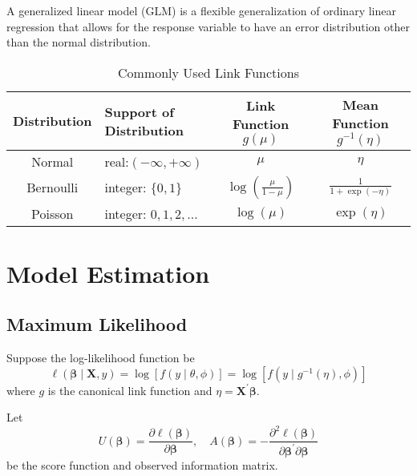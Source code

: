 \begin{remark}
    A generalized linear model (GLM) is a flexible generalization of ordinary linear regression that allows for the response variable to have an error distribution other than the normal distribution.
\end{remark}

\begin{table}[hpt]
    \centering
    \caption{Commonly Used Link Functions}
    \begin{tabular}{clcc}
        \toprule
        Distribution & Support of Distribution  & Link Function $g(\mu)$               & Mean Function $g^{-1}(\eta)$ \\
        \midrule
        Normal       & real:$(-\infty,+\infty)$ & $\mu$                                & $\eta$                       \\
        Bernoulli    & integer: $\{0,1\}$       & $\log\left(\frac{\mu}{1-\mu}\right)$ & $\frac{1}{1+\exp(-\eta)}$    \\
        Poisson      & integer: $0,1,2,\ldots$  & $\log\left(\mu\right)$               & $\exp\left(\eta\right)$      \\
        \bottomrule
    \end{tabular}
\end{table}

\section{Model Estimation}

\subsection{Maximum Likelihood}

Suppose the log-likelihood function be
\begin{equation}
    \ell\left(\boldsymbol{\beta}\mid\mathbf{X},y\right)=\log\left[f\left(y\mid\theta,\phi\right)\right]=\log\left[f\left(y\mid g^{-1}(\eta),\phi\right)\right]
\end{equation}
where $g$ is the canonical link function and $\eta=\mathbf{X}^{\prime}\boldsymbol{\beta}$.

Let
\begin{equation*}
    U\left(\boldsymbol{\beta}\right)=\frac{\partial\ell\left(\boldsymbol{\beta}\right)}{\partial\boldsymbol{\beta}},\quad A\left(\boldsymbol{\beta}\right)=-\frac{\partial^{2}\ell\left(\boldsymbol{\beta}\right)}{\partial\boldsymbol{\beta}^{\prime}\partial\boldsymbol{\beta}}
\end{equation*}
be the score function and observed information matrix.

